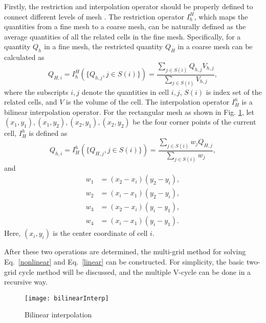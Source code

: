 \documentclass[3p,12pt]{elsarticle}
\begin{document}
	Firstly, the restriction and interpolation operator should be properly defined to connect different levels of mesh \cite{zhu2017unified}. The restriction operator $I_{h}^{H}$, which maps the quantities from a fine mesh to a coarse mesh, can be naturally defined as the average quantities of all the related cells in the fine mesh. Specifically, for a quantity $Q_h$ in a fine mesh, the restricted quantity $Q_H$ in a coarse mesh can be calculated as
	\begin{equation}
		Q_{H,i} = I_{h}^{H}(\{ Q_{h,j}, j \in S(i)\}) = \frac{\sum_{j \in S(i)}Q_{h,j}V_{h,j}}{\sum_{j \in S(i)}V_{h,j}},
	\end{equation}
	where the subscripts $i,j$ denote the quantities in cell $i,j$, $S(i)$ is index set of the related cells, and $V$ is the volume of the cell.
	The interpolation operator $I_H^h$ is a bilinear interpolation operator. For the rectangular mesh as shown in Fig. \ref{BiIn}, let $(x_1,y_1), (x_1,y_2), (x_2,y_1), (x_2, y_2)$ be the four corner points of the current cell, $I_H^h$ is defined as
	\begin{equation}
		Q_{h,i} = I_H^h (\{Q_{H,j}, j \in S(i) \}) = \frac{\sum_{j \in S(i)}w_jQ_{H,j}}{\sum_{j \in S(i)}w_j},
	\end{equation}
	and
	\begin{equation}
		\begin{aligned}
			w_1 &= (x_2 - x_i)(y_2 - y_i), \\
			w_2 &= (x_i - x_1)(y_2 - y_i), \\
			w_3 &= (x_2 - x_i)(y_i - y_1), \\
			w_4 &= (x_i - x_1)(y_i - y_1).
		\end{aligned}
	\end{equation}
	Here, $(x_i, y_i)$ is the center coordinate of cell $i$.
	
	After these two operations are determined, the multi-grid method for solving Eq.~\eqref{nonlinear} and Eq.~\eqref{linear} can be constructed.
	For simplicity, the basic two-grid cycle method will be discussed, and the multiple V-cycle can be done in a recursive way.
	
	\begin{figure}
		\centering
		\texttt{[image: bilinearInterp]}
		\caption{Bilinear interpolation}
		\label{BiIn}
	\end{figure}
	
	
	
	
\end{document}
